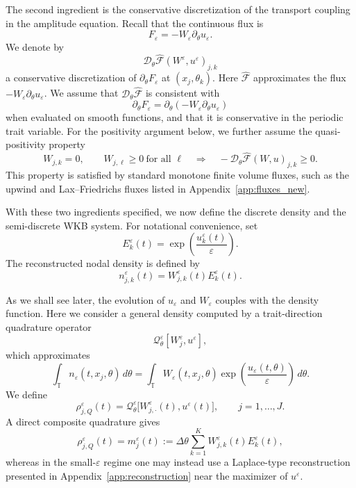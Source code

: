 \documentclass[11pt]{article}
\begin{document}
The second ingredient is the conservative discretization of the transport
coupling in the amplitude equation. Recall that the continuous flux is
\[
F_\varepsilon=-W_\varepsilon\partial_\theta u_\varepsilon .
\]
We denote by
\[
\mathcal D_\theta\widehat{\mathcal F}(W^\varepsilon,u^\varepsilon)_{j,k}
\]
a conservative discretization of \(\partial_\theta F_\varepsilon\) at
\((x_j,\theta_k)\). Here \(\widehat{\mathcal F}\) approximates the flux
\(-W_\varepsilon\partial_\theta u_\varepsilon\). We assume that
\(\mathcal D_\theta\widehat{\mathcal F}\) is consistent with
\[
\partial_\theta F_\varepsilon
=
\partial_\theta(-W_\varepsilon\partial_\theta u_\varepsilon)
\]
when evaluated on smooth functions, and that it is conservative in the
periodic trait variable. For the positivity argument below, we further assume
the quasi-positivity property
\begin{equation}\label{ass:H_flux}
W_{j,k}=0,
\qquad
W_{j,\ell}\ge0\ \text{for all }\ell
\quad\Longrightarrow\quad
-\mathcal D_\theta\widehat{\mathcal F}(W,u)_{j,k}\ge0 .
\end{equation}
This property is satisfied by standard monotone finite volume fluxes, such as
the upwind and Lax--Friedrichs fluxes listed in Appendix~\ref{app:fluxes_new}.

With these two ingredients specified, we now define the discrete density and
the semi-discrete WKB system. For notational convenience, set
\begin{equation}\label{def:E}
E_k^\varepsilon(t)
=
\exp\!\left(\frac{u_k^\varepsilon(t)}{\varepsilon}\right).
\end{equation}
The reconstructed nodal density is defined by
\begin{equation}\label{def:n_reconstructed}
n_{j,k}^\varepsilon(t)
=
W_{j,k}^\varepsilon(t)E_k^\varepsilon(t).
\end{equation}


As we shall see later, the evolution of $u_\varepsilon$ and $W_\varepsilon$ 
couples with the density function. 
Here we consider a general density computed by a
trait-direction quadrature operator
\[
\mathcal Q_\theta^\varepsilon[W_j^\varepsilon,u^\varepsilon],
\]
which approximates
\[
\int_{\mathbb T}
n_\varepsilon(t,x_j,\theta)
\,d\theta 
=
\int_{\mathbb T}
W_\varepsilon(t,x_j,\theta)
\exp\!\left(\frac{u_\varepsilon(t,\theta)}{\varepsilon}\right)
\,d\theta .
\]
We define
\begin{equation}\label{eq:E_rho}
\rho_{j,Q}^\varepsilon(t)
=
\mathcal Q_\theta^\varepsilon
\bigl[W_{j,\cdot}^\varepsilon(t),u^\varepsilon(t)\bigr],
\qquad
j=1,\dots,J .
\end{equation}
A direct composite quadrature gives
\begin{equation} \label{def:m}
\rho_{j,Q}^\varepsilon(t)
=
m_j^\varepsilon(t)
:=
\Delta\theta
\sum_{k=1}^K
W_{j,k}^\varepsilon(t)E_k^\varepsilon(t),
\end{equation}
whereas in the small-\(\varepsilon\) regime one may instead use a
Laplace-type reconstruction presented in
Appendix~\ref{app:reconstruction} near the maximizer of
\(u^\varepsilon\).
\end{document}
